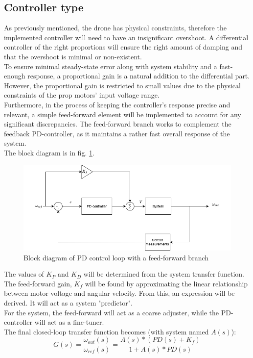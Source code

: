 \subsection{Controller type}
As previously mentioned, the drone has physical constraints, therefore the implemented controller will need to have an insignificant overshoot. A differential controller of the right proportions will ensure the right amount of damping and that the overshoot is minimal or non-existent. \\
To ensure minimal steady-state error along with system stability and a fast-enough response, a proportional gain is a natural addition to the differential part. However, the proportional gain is restricted to small values due to the physical constraints of the prop motors' input voltage range. \\
Furthermore, in the process of keeping the controller's response precise and relevant, a simple feed-forward element will be implemented to account for any significant discrepancies. The feed-forward branch works to complement the feedback PD-controller, as it maintains a rather fast overall response of the system. \\
The block diagram is in fig. \ref{fig:controlblock}.

\begin{figure}[h!]
    \centering
    \includegraphics[width=1.0\textwidth]{figures/control_loops/control_block_diagram.png}
    \caption{Block diagram of PD control loop with a feed-forward branch}
    \label{fig:controlblock}
\end{figure}

The values of $K_P$ and $K_D$ will be determined from the system transfer function. The feed-forward gain, $K_f$ will be found by approximating the linear relationship between motor voltage and angular velocity. From this, an expression will be derived. It will act as a system "predictor". \\
For the system, the feed-forward will act as a coarse adjuster, while the PD-controller will act as a fine-tuner.\\
The final closed-loop transfer function becomes (with system named $A(s)$):
\begin{equation}
    G(s) = \frac{\omega_{out}(s)}{\omega_{ref}(s)} = \frac{A(s)*\left(PD(s)+K_f\right)}{1+A(s)*PD(s)}
\end{equation}


